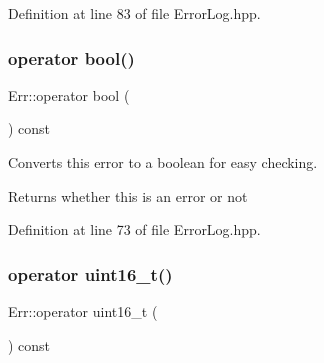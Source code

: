 Definition at line 83 of file Error\+Log.\+hpp.


\begin{DoxyCode}{0}

\end{DoxyCode}
\mbox{\label{classErr_ae06ae9da0fc2aeeab3d8fd5e709cab9e}} 
\subsubsection{\texorpdfstring{operator bool()}{operator bool()}}
{\footnotesize\ttfamily Err\+::operator bool (\begin{DoxyParamCaption}{ }\end{DoxyParamCaption}) const\hspace{0.3cm}{\ttfamily [inline]}}

Converts this error to a boolean for easy checking.

\begin{DoxyReturn}{Returns}
whether this is an error or not 
\end{DoxyReturn}


Definition at line 73 of file Error\+Log.\+hpp.


\begin{DoxyCode}{0}

\end{DoxyCode}
\mbox{\label{classErr_a9cc396112612083a8d9c2cea6fa6224a}} 
\subsubsection{\texorpdfstring{operator uint16\_t()}{operator uint16\_t()}}
{\footnotesize\ttfamily Err\+::operator uint16\+\_\+t (\begin{DoxyParamCaption}{ }\end{DoxyParamCaption}) const\hspace{0.3cm}{\ttfamily [inline]}}

